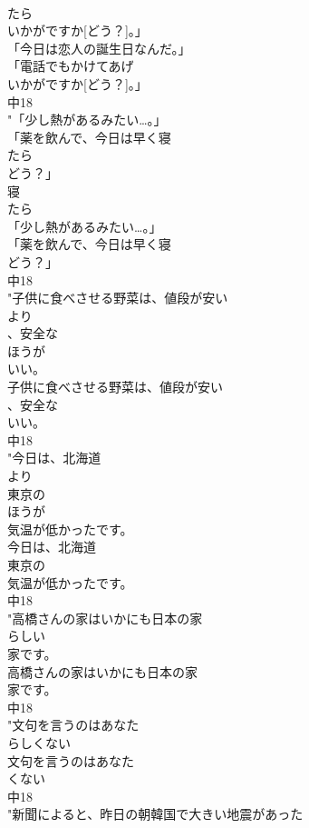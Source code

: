 \documentclass[8pt]{extreport}
\begin{document}
\begin{CJK}{UTF8}{min}
\\	たら
\\	いかがですか[どう？]。」
\\	「今日は恋人の誕生日なんだ。」
\\	「電話でもかけてあげ
\\	いかがですか[どう？]。」
\\	中18
\\	"「少し熱があるみたい…。」
\\	「薬を飲んで、今日は早く寝
\\	たら
\\	どう？」
\\	寝
\\	たら
\\	「少し熱があるみたい…。」
\\	「薬を飲んで、今日は早く寝
\\	どう？」
\\	中18
\\	"子供に食べさせる野菜は、値段が安い
\\	より
\\	、安全な
\\	ほうが
\\	いい。
\\	子供に食べさせる野菜は、値段が安い
\\	、安全な
\\	いい。
\\	中18
\\	"今日は、北海道
\\	より
\\	東京の
\\	ほうが
\\	気温が低かったです。
\\	今日は、北海道
\\	東京の
\\	気温が低かったです。
\\	中18
\\	"高橋さんの家はいかにも日本の家
\\	らしい
\\	家です。
\\	高橋さんの家はいかにも日本の家
\\	家です。
\\	中18
\\	"文句を言うのはあなた
\\	らしくない
\\	文句を言うのはあなた
\\	くない
\\	中18
\\	"新聞によると、昨日の朝韓国で大きい地震があった

\end{CJK}
\end{document}

